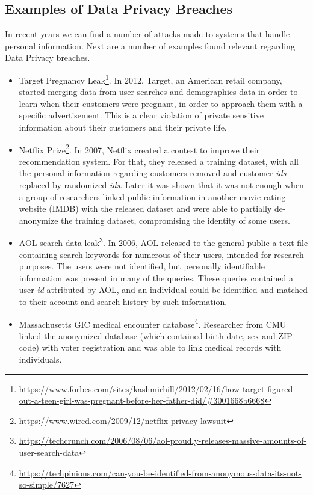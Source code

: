 \subsection{Examples of Data Privacy Breaches}
\label{ssec:ExamplesDataPrivacyBreaches}


In recent years we can find a number of attacks made to systems that handle personal information. Next are a number of examples found relevant regarding Data Privacy breaches.

\begin{itemize}
    \setlength\itemsep{1em}

    \item Target Pregnancy Leak\footnote{\url{https://www.forbes.com/sites/kashmirhill/2012/02/16/how-target-figured-out-a-teen-girl-was-pregnant-before-her-father-did/\#3001668b6668}}. In 2012, Target, an American retail company, started merging data from user searches and demographics data in order to learn when their customers were pregnant, in order to approach them with a specific advertisement. This is a clear violation of private sensitive information about their customers and their private life.


    \item Netflix Prize\footnote{\url{https://www.wired.com/2009/12/netflix-privacy-lawsuit}}. In 2007, Netflix created a contest to improve their recommendation system. For that, they released a training dataset, with all the personal information regarding customers removed and customer \textit{ids} replaced by randomized \textit{ids}. Later it was shown that it was not enough when a group of researchers linked public information in another movie-rating website (IMDB) with the released dataset and were able to partially de-anonymize the training dataset, compromising the identity of some users.

    \item AOL search data leak\footnote{\url{https://techcrunch.com/2006/08/06/aol-proudly-releases-massive-amounts-of-user-search-data}}. In 2006, AOL released to the general public a text file containing search keywords for numerous of their users, intended for research purposes. The users were not identified, but personally identifiable information was present in many of the queries. These queries contained a user \textit{id} attributed by AOL, and an individual could be identified and matched to their account and search history by such information.



   \item Massachusetts GIC medical encounter database\footnote{\url{https://techpinions.com/can-you-be-identified-from-anonymous-data-its-not-so-simple/7627}}. Researcher from \ac{CMU} linked the anonymized database (which contained birth date, sex and ZIP code) with voter registration and was able to link medical records with individuals.


\end{itemize}